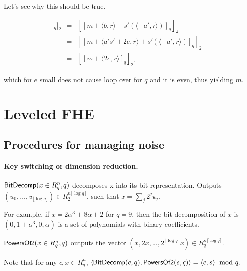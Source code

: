 \documentclass[11pt]{article}
\begin{document}




Let's see why this should be true.

\begin{eqnarray*}
[[\langle c, s \rangle]_q]_2 &=& [[m + \langle b, r \rangle + s'(\langle -a', r \rangle) ]_q]_2 \\
&=& [[m + \langle a's'+2e, r \rangle + s'(\langle -a', r \rangle) ]_q]_2  \\
&=& [[m + \langle 2e, r \rangle ]_q]_2,
\end{eqnarray*}

which for $e$ small does not cause loop over for $q$ and it is even, thus yielding $m$.


\section{Leveled FHE}


\subsection{Procedures for managing noise}

\paragraph{Key switching or dimension reduction.}
$\mathsf{BitDecomp}(x \in R^n_q, q)$ decomposes x into its bit representation. Outputs $(u_0, \dots, u_{\lfloor \log q \rfloor}) \in R_2^{n\lceil \log q \rceil }$, such that $x = \sum_j 2^j u_j$.

For example, if $x = 2 \alpha^3 + 8 \alpha + 2$ for $q = 9$, then the bit decomposition of $x$ is $(0, 1+\alpha^3, 0, \alpha)$ is a set of polynomials with binary coefficients.

$\mathsf{PowersOf2}(x \in R^n_q, q)$ outputs the vector $(x, 2x, \dots, 2^{\lfloor \log q \rfloor} x) \in R_q^{n \lceil \log q \rceil }$.

Note that for any $c, x \in R^n_q$, $\langle \mathsf{BitDecomp}(c, q), \mathsf{PowersOf2}(s, q)\rangle = \langle c, s \rangle \mod q. $
\end{document}
